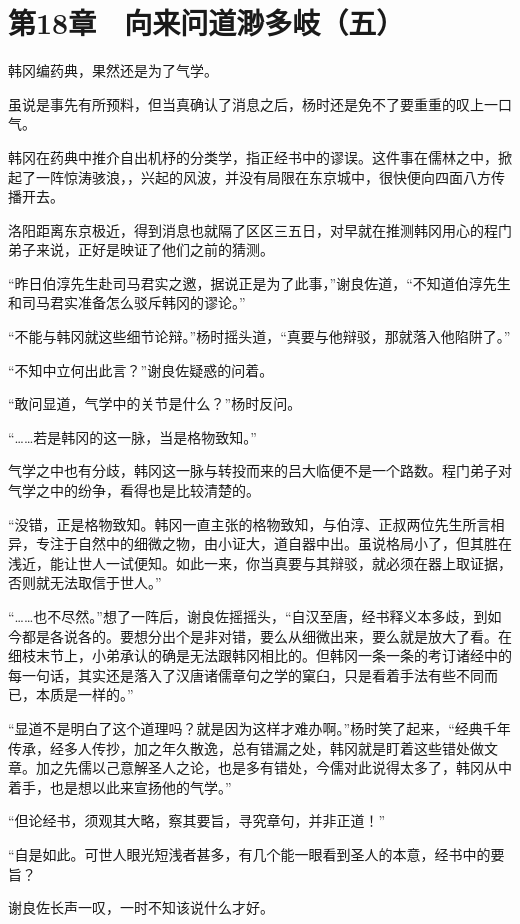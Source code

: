 \section{第18章　向来问道渺多岐（五）}

韩冈编药典，果然还是为了气学。

虽说是事先有所预料，但当真确认了消息之后，杨时还是免不了要重重的叹上一口气。

韩冈在药典中推介自出机杼的分类学，指正经书中的谬误。这件事在儒林之中，掀起了一阵惊涛骇浪，，兴起的风波，并没有局限在东京城中，很快便向四面八方传播开去。

洛阳距离东京极近，得到消息也就隔了区区三五日，对早就在推测韩冈用心的程门弟子来说，正好是映证了他们之前的猜测。

“昨日伯淳先生赴司马君实之邀，据说正是为了此事，”谢良佐道，“不知道伯淳先生和司马君实准备怎么驳斥韩冈的谬论。”

“不能与韩冈就这些细节论辩。”杨时摇头道，“真要与他辩驳，那就落入他陷阱了。”

“不知中立何出此言？”谢良佐疑惑的问着。

“敢问显道，气学中的关节是什么？”杨时反问。

“……若是韩冈的这一脉，当是格物致知。”

气学之中也有分歧，韩冈这一脉与转投而来的吕大临便不是一个路数。程门弟子对气学之中的纷争，看得也是比较清楚的。

“没错，正是格物致知。韩冈一直主张的格物致知，与伯淳、正叔两位先生所言相异，专注于自然中的细微之物，由小证大，道自器中出。虽说格局小了，但其胜在浅近，能让世人一试便知。如此一来，你当真要与其辩驳，就必须在器上取证据，否则就无法取信于世人。”

“……也不尽然。”想了一阵后，谢良佐摇摇头，“自汉至唐，经书释义本多歧，到如今都是各说各的。要想分出个是非对错，要么从细微出来，要么就是放大了看。在细枝末节上，小弟承认的确是无法跟韩冈相比的。但韩冈一条一条的考订诸经中的每一句话，其实还是落入了汉唐诸儒章句之学的窠臼，只是看着手法有些不同而已，本质是一样的。”

“显道不是明白了这个道理吗？就是因为这样才难办啊。”杨时笑了起来，“经典千年传承，经多人传抄，加之年久散逸，总有错漏之处，韩冈就是盯着这些错处做文章。加之先儒以己意解圣人之论，也是多有错处，今儒对此说得太多了，韩冈从中着手，也是想以此来宣扬他的气学。”

“但论经书，须观其大略，察其要旨，寻究章句，并非正道！”

“自是如此。可世人眼光短浅者甚多，有几个能一眼看到圣人的本意，经书中的要旨？

谢良佐长声一叹，一时不知该说什么才好。

